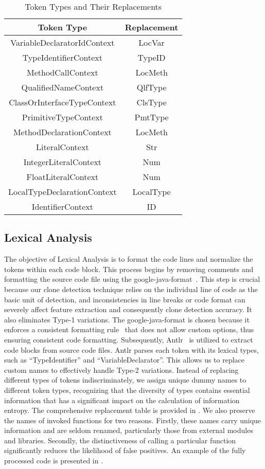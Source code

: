 \begin{table}[h]
\centering
\caption{Token Types and Their Replacements}
\label{tab:token_replacements}
\begin{tabular}{cc}
\hline
\textbf{Token Type} & \textbf{Replacement} \\ \hline
VariableDeclaratorIdContext & LocVar \\
TypeIdentifierContext & TypeID \\
MethodCallContext & LocMeth \\
QualifiedNameContext & QlfType \\
ClassOrInterfaceTypeContext & ClsType \\
PrimitiveTypeContext & PmtType \\
MethodDeclarationContext & LocMeth \\
LiteralContext & Str \\
IntegerLiteralContext & Num \\
FloatLiteralContext & Num \\
LocalTypeDeclarationContext & LocalType \\
IdentifierContext & ID \\ \hline
\end{tabular}
\end{table}

\subsection{Lexical Analysis}
The objective of Lexical Analysis is to format the code lines and normalize the tokens within each code block. 
This process begins by removing comments and formatting the source code file using the google-java-format~\cite{formatter}. 
This step is crucial because our clone detection technique relies on the individual line of code as the basic unit of detection, and inconsistencies in line breaks or code format can severely affect feature extraction and consequently clone detection accuracy. 
It also eliminates Type-1 variations. 
The google-java-format is chosen because it enforces a consistent formatting rule~\cite{googlestyle} that does not allow custom options, thus ensuring consistent code formatting. 
Subsequently, Antlr~\cite{antlr4} is utilized to extract code blocks from source code files. 
Antlr parses each token with its lexical types, such as ``TypeIdentifier'' and ``VariableDeclarator''. 
This allows us to replace custom names to effectively handle Type-2 variations. 
Instead of replacing different types of tokens indiscriminately, we assign unique dummy names to different token types, recognizing that the diversity of types contains essential information that has a significant impact on the calculation of information entropy. 
The comprehensive replacement table is provided in . 
We also preserve the names of invoked functions for two reasons.
Firstly, these names carry unique information and are seldom renamed, particularly those from external modules and libraries. 
Secondly, the distinctiveness of calling a particular function significantly reduces the likelihood of false positives. 
An example of the fully processed code is presented in .

